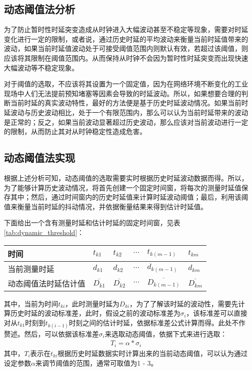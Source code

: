 \subsection{动态阈值法分析}
为了防止暂时性时延突变造成从时钟进入大幅波动甚至不稳定等现象，需要对时延变化进行一定的限制，或者说，通过历史时延的平均波动来衡量当前时延值带来的波动，如果当前时延值波动处于可接受阈值范围内则默认有效，若超过该阈值，则应该将其限制在阈值范围内。从而保持从时钟不会因为暂时性时延突变而出现快速大幅波动等不稳定现象。

对于阈值的选取，不应该将其设置为一个固定值，因为在网络环境不断变化的工业现场中人们无法提前预知堵塞等因素会导致的时延波动。所以，如果想要合理的判断当前时延的真实波动特性，最好的方法便是基于历史时延波动情况。如果当前时延波动与历史波动相比，处于一个有限范围内，那么可以认为当前时延带来的波动是正常的；反之，如果当前波动显著超过历史波动，那么应该对当前波动进行一定的限制，从而防止其对从时钟稳定性造成危害。

\subsection{动态阈值法实现}
根据上述分析可知，动态阈值的选取需要实时根据历史时延波动数据而得。所以，为了能够计算历史波动情况，将首先创建一个固定时间窗，将每次的测量时延值保存其中；然后，通过时间窗内的历史时延值来计算时延波动阈值；最后，利用该阈值来衡量当前时延的抖动情况，并依据衡量结果来得到估计时延值。

下面给出一个含有测量时延和估计时延的固定时间窗，见表\ref{tab:dynamic_threshold}：
\begin{table}[!hpb]
  \centering
  \begin{tabular}{llllll} \toprule
  	时间 & $t_{k1}$ & $t_{k2}$ & $\cdots$ & $t_{k(m-1)}$ & $t_{km}$ \\ \midrule
    当前测量时延 & $d_{k1}$ & $d_{k2}$ & $\cdots$ & $d_{k(m-1)}$ & $d_{km}$ \\ \midrule
    动态阈值法时延估计值 & $\overline{D_{k1}}$ & $\overline{D_{k2}}$ & $\cdots$ & $\overline{D_{k(m-1)}}$ & $\overline{D_{km}}$  \\ \bottomrule
  \end{tabular}
\end{table}

其中，当前为时间$t_{ki}$，此时测量时延为$D_{ki}$，为了了解该时延的波动性，需要先计算历史时延的波动标准差，此时，假设之前的波动标准差为$\sigma_{i}$，该标准差可以直接对从$t_{k1}$时刻到$t_{k(i-1)}$时刻之间的估计时延，依据标准差公式计算而得。此处不作赘述。然后，可以依据该标准差$\sigma_{i}$来选取动态阈值，依据下式来进行选取：
\begin{align}
T_{i} = \alpha * \sigma_{i}
\end{align}
其中，$T_{i}$表示在$t_{ki}$根据历史时延数据实时计算出来的当前动态阈值，可以认为通过设定参数$\alpha$来调节阈值的范围，通常可取值为1 - 3。

